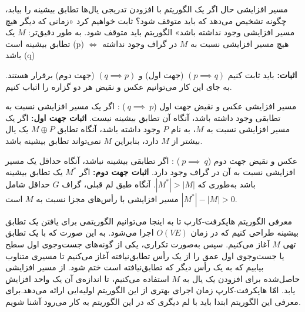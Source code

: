 \begin{itemframe}{مسیر افزایشی}
\itm
حال اگر یک الگوریتم با افزودن تدریجی یال‌ها تطابق بیشینه را بیابد، چگونه تشخیص می‌دهد که باید متوقف شود؟ ثابت خواهیم کرد «زمانی که دیگر هیچ مسیر افزایشی وجود نداشته باشد» الگوریتم باید متوقف شود. به طور دقیق‌تر:
\itm
$M$ یک تطابق بیشینه است (p)
$\iff$
 هیچ مسیر افزایشی نسبت به $M$ در گراف وجود نداشته باشد (q)

\itm
\textbf{اثبات:}
باید ثابت کنیم
$(p \implies q) $
 (جهت اول) و
$ (q \implies p)$
 (جهت دوم) برقرار هستند. به جای این کار می‌توانیم عکس و نقیض
 هر دو گزاره را اثباب کنیم.

\end{itemframe}

\begin{itemframe}{مسیر افزایشی}
\itm
عکس و نقیض جهت اول
($~q\implies~p$)
: اگر یک مسیر افزایشی نسبت به تطابقی وجود داشته باشد، آنگاه آن تطابق بیشینه نیست.
\itm
\textbf{اثبات جهت اول:}
اگر یک مسیر افزایشی نسبت به $M$، به نام $P$ وجود داشته باشد، آنگاه تطابق $M \oplus P$ یک یال بیشتر از $M$ دارد، بنابراین $M$ نمی‌تواند تطابق بیشینه باشد.

\itm
عکس و نقیض جهت دوم
($‍~p \implies ~q$)
: اگر تطابقی بیشینه نباشد، آنگاه حداقل یک مسیر افزایشی نسبت به آن در گراف وجود دارد.
\itm
\textbf{اثبات جهت دوم:}
اگر $M^*$ یک تطابق بیشینه باشد به‌طوری که $|M^*| > |M|$. آنگاه طبق لم قبلی، گراف $G$ حداقل شامل
$|M^*| - |M| > 0$
 مسیر افزایشی با رأس‌های مجزا نسبت به $M$ است.
\end{itemframe}

\begin{itemframe}{‌معرفی الگوریتم هاپکرفت-کارپ}
\itm
تا به اینجا می‌توانیم الگوریتمی برای یافتن یک تطابق بیشینه طراحی کنیم که در زمان $O(VE)$ اجرا می‌شود.
\itm
به این صورت که با یک تطابق تهی $M$ آغاز می‌کنیم. سپس به‌صورت تکراری، یکی از گونه‌های جست‌وجوی اول سطح یا جست‌وجوی اول عمق را از یک رأس تطابق‌نیافته آغاز می‌کنیم تا مسیری متناوب بیابیم که به یک رأس دیگر که تطابق‌نیافته است ختم شود.
\itm
از مسیر افزایشی حاصل‌شده برای افزودن یک یال به $M$ استفاده می‌کنیم، تا اندازه‌ی آن یک واحد افزایش یابد.
\itm
امّا هاپکرفت-کارپ زمان اجرای بهتری از این الگوریتم اولیه‌ایی ارائه می‌دهد.برای معرفی این الگوریتم ابتدا باید با لم دیگری که در این الگوریتم به کار می‌رود آشنا شویم.
\end{itemframe}


